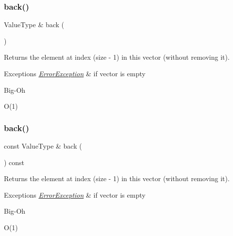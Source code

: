 \subsubsection{\texorpdfstring{back()}{back()}\hspace{0.1cm}{\footnotesize\ttfamily [1/2]}}
{\footnotesize\ttfamily Value\+Type \& back (\begin{DoxyParamCaption}{ }\end{DoxyParamCaption})}



Returns the element at index (size -\/ 1) in this vector (without removing it). 


\begin{DoxyExceptions}{Exceptions}
{\em \mbox{\hyperlink{classErrorException}{Error\+Exception}}} & if vector is empty \\
\hline
\end{DoxyExceptions}
\begin{DoxyRefDesc}{Big-\/\+Oh}
\item[\mbox{\hyperlink{BigOh__BigOh000107}{Big-\/\+Oh}}]O(1) \end{DoxyRefDesc}
\mbox{\label{classVector_adc761c91bdacd01bed5c96e25fd9486a}} 
\subsubsection{\texorpdfstring{back()}{back()}\hspace{0.1cm}{\footnotesize\ttfamily [2/2]}}
{\footnotesize\ttfamily const Value\+Type \& back (\begin{DoxyParamCaption}{ }\end{DoxyParamCaption}) const}



Returns the element at index (size -\/ 1) in this vector (without removing it). 


\begin{DoxyExceptions}{Exceptions}
{\em \mbox{\hyperlink{classErrorException}{Error\+Exception}}} & if vector is empty \\
\hline
\end{DoxyExceptions}
\begin{DoxyRefDesc}{Big-\/\+Oh}
\item[\mbox{\hyperlink{BigOh__BigOh000108}{Big-\/\+Oh}}]O(1) \end{DoxyRefDesc}
\mbox{\label{classVector_a0c62c15c8ed609e7e5e9518cf5f5c712}} 
